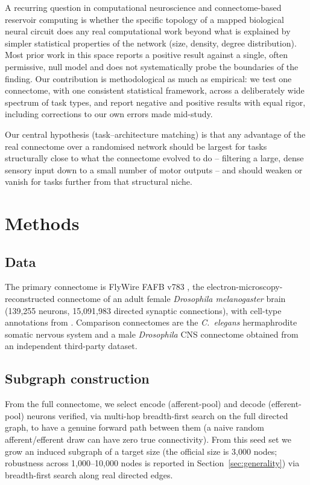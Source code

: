 \documentclass[11pt]{article}
\begin{document}
A recurring question in computational neuroscience and connectome-based
reservoir computing \citep{suarez2024conn2res, costi2025flywire} is
whether the specific topology of a mapped biological neural circuit
does any real computational work beyond what is explained by simpler
statistical properties of the network (size, density, degree
distribution). Most prior work in this space reports a positive result
against a single, often permissive, null model and does not
systematically probe the boundaries of the finding. Our contribution is
methodological as much as empirical: we test one connectome, with one
consistent statistical framework, across a deliberately wide spectrum of
task types, and report negative and positive results with equal rigor,
including corrections to our own errors made mid-study.

Our central hypothesis (task--architecture matching) is that any
advantage of the real connectome over a randomised network should be
largest for tasks structurally close to what the connectome evolved to
do -- filtering a large, dense sensory input down to a small number of
motor outputs -- and should weaken or vanish for tasks further from
that structural niche.

\section{Methods}

\subsection{Data}

The primary connectome is FlyWire FAFB v783 \citep{dorkenwald2024flywire},
the electron-microscopy-reconstructed connectome of an adult female
\emph{Drosophila melanogaster} brain (139{,}255 neurons, 15{,}091{,}983
directed synaptic connections), with cell-type annotations from
\citet{schlegel2024flywire}. Comparison connectomes are the
\emph{C.~elegans} hermaphrodite somatic nervous system
\citep{cook2019celegans} and a male \emph{Drosophila} CNS connectome
obtained from an independent third-party dataset.

\subsection{Subgraph construction}

From the full connectome, we select encode (afferent-pool) and decode
(efferent-pool) neurons verified, via multi-hop breadth-first search on
the full directed graph, to have a genuine forward path between them
(a naive random afferent/efferent draw can have zero true connectivity).
From this seed set we grow an induced subgraph of a target size (the
official size is 3{,}000 nodes; robustness across 1{,}000--10{,}000 nodes
is reported in Section~\ref{sec:generality}) via breadth-first search
along real directed edges.
\end{document}
